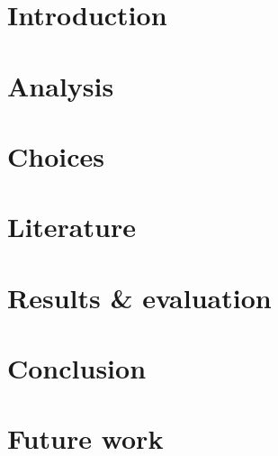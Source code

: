 \documentclass[a4paper,10pt]{article}
\begin{document}

\tableofcontents


\section{Introduction}
\label{sec:introduction}


\section{Analysis}
\label{sec:analysis}


\section{Choices}
\label{sec:choices}


\section{Literature}
\label{sec:literature}


\section{Results \& evaluation}
\label{sec:results}


\section{Conclusion}
\label{sec:conclusion}


\section{Future work}
\label{sec:future-work}

\end{document}
